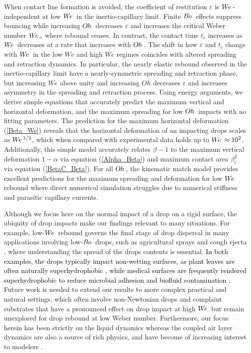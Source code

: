 \documentclass{jfm}
\newcommand{\edit}[1]{\textcolor{black}{#1}}
\newcommand{\We}{W\kern-0.15em e\,}
\newcommand{\Bo}{B\kern-0.05em o\,}
\newcommand{\Oh}{O\kern-0.05em h\,}
\begin{document}
When contact line formation is avoided, the coefficient of restitution $\varepsilon$ is $\We$-independent at low $\We$ in the inertio-capillary limit. Finite $\Bo$ effects suppress bouncing while increasing $\Oh$ decreases $\varepsilon$ and increases the critical Weber number $\We_{c}$ where rebound ceases. In contrast, the contact time $t_{c}$ increases as $\We$ decreases at a rate that increases with $\Oh$. The shift in how $\varepsilon$ and $t_{c}$ change with $\We$ in the low $We$ and high $We$ regimes coincides with altered spreading and retraction dynamics. In particular, the nearly elastic rebound observed in the inertio-capillary limit have a nearly-symmetric spreading and retraction phase, but increasing $We$ above unity and increasing $Oh$ decreases $\varepsilon$ and increases asymmetry in the spreading and retraction process. Using energy arguments, we derive simple equations that accurately predict the maximum vertical and horizontal deformation, and the maximum spreading for low $\Oh$ impacts with no fitting parameters. The prediction for the maximum horizontal deformation (\ref{Beta_We}) reveals that the horizontal deformation of an impacting drops scales as $\We^{1/2}$, which when compared with experimental data holds up to $\We\approx 10^{2}$. Additionally, this simple model accurately relates $\beta-1$ to the maximum vertical deformation $1-\alpha$ via equation (\ref{Alpha_Beta}) and maximum contact area $\beta_{c}^{2}$ via equation (\ref{BetaC_Beta}). For all $\Oh$, the kinematic match model provides excellent predictions for the maximum spreading and deformation for low $\We$ rebound where direct numerical simulation struggles due to numerical stiffness and parasitic capillary currents.

Although we focus here on the normal impact of a drop on a rigid surface, the ubiquity of drop impacts make our findings relevant to many situations. For example, low-$\We$ rebound governs the final stage of drop dispersal in many applications involving low-$\Bo$ drops, such as agricultural sprays \citep{kooij2018determines,makhnenko2021review,chen2022droplet} and cough ejecta \citep{dbouk2020coughing,bourouiba2021fluid}, where understanding the spread of the drops contents is essential. \edit{In both examples, the drops typically impact non-wetting surfaces, as plant leaves are often naturally superhydrophobic \citep{barthlott1997purity}, while medical surfaces are frequently rendered superhydrophobic to reduce microbial adhesion and biofluid contamination \citep{falde2016superhydrophobic}.} Future work is needed to extend our results to more complex practical and natural settings, which often involve non-Newtonian drops and complaint substrates that have a pronounced effect on drop impact at high $\We$ \citep{bartolo2007dynamics,basso2020splashing} but remain unexplored for drop rebound at low Weber number. Furthermore, our focus herein has been strictly on the liquid dynamics whereas the coupled air layer dynamics are also a source of rich physics, and have become of increasing interest to modelers \cite{Phillips_Milewski_2024,sprittles2024gas}.
\end{document}
